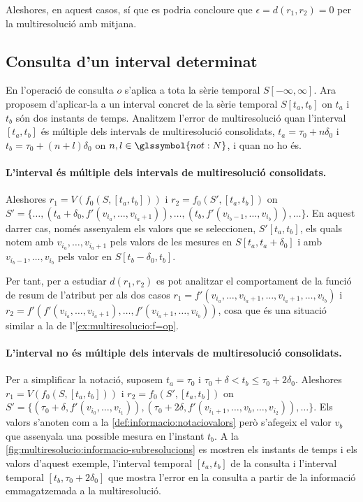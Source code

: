   Aleshores, en aquest casos, sí que es podria concloure que
  $\epsilon=d(r_1,r_2)=0$ per la multiresolució amb mitjana.



\subsection{Consulta d'un interval determinat}
\label{ex:multireoslucio:informacio-subresolucions}

En  l'operació de consulta $o$
s'aplica a tota la sèrie temporal $S[-\infty,\infty]$. Ara proposem
d'aplicar-la a un interval concret de la sèrie temporal $S[t_a,t_b]$
on $t_a$ i $t_b$ són dos instants de temps.  Analitzem l'error de
multiresolució quan l'interval $[t_a,t_b]$ és múltiple dels intervals
de multiresolució consolidats, $t_a=\tau_0+n\delta_0$ i
$t_b=\tau_0+(n+l)\delta_0$ on $n,l\in\glssymbol{not:N}$, i quan no ho
és.


\paragraph{L'interval és múltiple dels intervals de multiresolució
  consolidats.} Aleshores $r_1=V(f_0(S,[t_a,t_b]))$ i
$r_2=f_0(S',[t_a,t_b])$ on $S'= \{ \dotsc, (t_a+\delta_0,
f'(v_{i_a},\dotsc,v_{i_a+1}) ), \dotsc, (t_b,
f'(v_{i_b-1},\dotsc,v_{i_b})), \dotsc \}$. En aquest darrer cas, només
assenyalem els valors que se seleccionen, $S'[t_a,t_b]$, els quals
notem amb $v_{i_a},\dotsc,v_{i_a+1}$ pels valors de les mesures en
$S[t_a,t_a+\delta_0]$ i amb $v_{i_b-1},\dotsc,v_{i_b}$ pels valor en
$S[t_b-\delta_0,t_b]$.

  Per tant, per a estudiar $d(r_1,r_2)$ es pot analitzar el
  comportament de la funció de resum de l'atribut per als dos casos
  $r_1=f'(v_{i_a},\dotsc,v_{i_a+1},\dotsc, v_{i_a+1},\dotsc,v_{i_b})$
  i $r_2=f'(f'(v_{i_a},\dotsc,v_{i_a+1}),\dotsc,
  f'(v_{i_a+1},\dotsc,v_{i_b}))$, cosa que és una situació similar a
  la de l'\autoref{ex:multiresolucio:f=op}.


  \paragraph{L'interval no és múltiple dels intervals de
    multiresolució consolidats.}  Per a simplificar la notació,
  suposem $t_a=\tau_0$ i $\tau_0+\delta < t_b \leq \tau_0+2\delta_0$.
  Aleshores $r_1=V(f_0(S,[t_a,t_b]))$ i $r_2=f_0(S',[t_a,t_b])$ on
  $S'= \{(\tau_0+\delta, f'(v_{i_0},\dotsc,v_{i_1}) ),(\tau_0+2\delta
  , f'(v_{i_1+1},\dotsc,v_{b} ,\dotsc,v_{i_2})), \dotsc \}$.  Els
  valors s'anoten com a la \autoref{def:informacio:notaciovalors} però
  s'afegeix el valor $v_b$ que assenyala una possible mesura en
  l'instant $t_b$.  A la
  \autoref{fig:multiresolucio:informacio-subresolucions} es mostren
  els instants de temps i els valors d'aquest exemple, l'interval
  temporal $[t_a,t_b]$ de la consulta i l'interval temporal
  $[t_b,\tau_0+2\delta_0]$ que mostra l'error en la consulta a partir
  de la informació emmagatzemada a la multiresolució.


